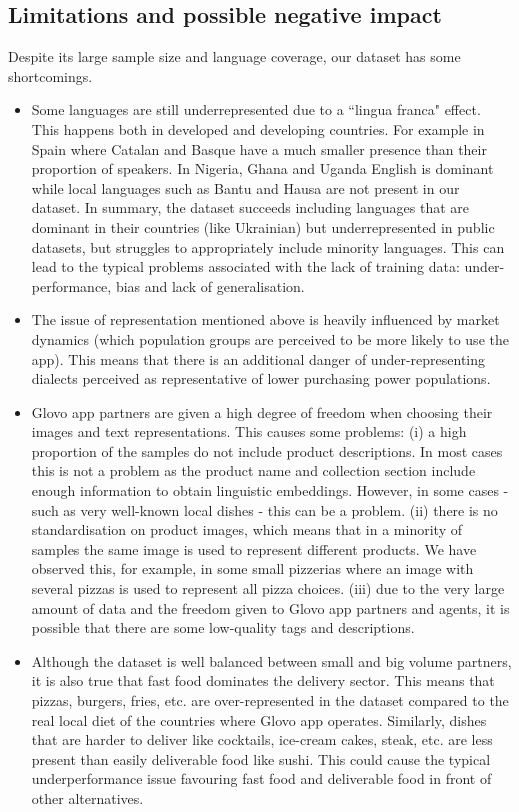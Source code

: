 \documentclass[10pt,twocolumn,letterpaper]{article}
\begin{document}
\subsection{Limitations and possible negative impact }\label{sec:limitations}
Despite its large sample size and language coverage, our dataset has some shortcomings.
\begin{itemize}
    \item Some languages are still underrepresented due to a ``lingua franca" effect. This happens both in developed and developing countries. For example in Spain where Catalan and Basque have a much smaller presence than their proportion of speakers. In Nigeria, Ghana and Uganda English is dominant while local languages such as Bantu and Hausa are not present in our dataset.  In summary, the dataset succeeds including languages that are dominant in their countries (like Ukrainian) but underrepresented in public datasets, but struggles to appropriately include minority languages. This can lead to the typical problems associated with the lack of training data: under-performance, bias and lack of generalisation.
    \item The issue of representation mentioned above is heavily influenced by market dynamics (which population groups are perceived to be more likely to use the app). This means that there is an additional danger of under-representing dialects perceived as representative of lower purchasing power populations.
    \item Glovo app partners are given a high degree of freedom when choosing their images and text representations. This causes some problems: (i) a high proportion of the samples do not include product descriptions. In most cases this is not a problem as the product name and collection section include enough information to obtain linguistic embeddings. However, in some cases - such as very well-known local dishes - this can be a problem. (ii) there is no standardisation on product images, which means that in a minority of samples the same image is used to represent different products. We have observed this, for example, in some small pizzerias where an image with several pizzas is used to represent all pizza choices. (iii) due to the very large amount of data and the freedom given to Glovo app partners and agents, it is possible that there are some low-quality tags and descriptions.
    \item Although the dataset is well balanced between small and big volume partners, it is also true that fast food dominates the delivery sector. This means that pizzas, burgers, fries, etc. are over-represented in the dataset compared to the real local diet of the countries where Glovo app operates. Similarly, dishes that are harder to deliver like cocktails, ice-cream cakes, steak, etc. are less present than easily deliverable food like sushi. This could cause the typical underperformance issue favouring fast food and deliverable food in front of other alternatives.

\end{itemize}
\end{document}
